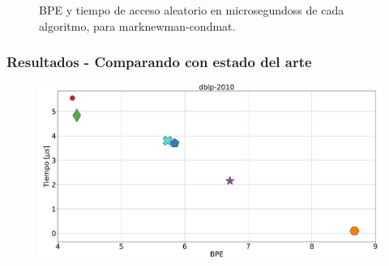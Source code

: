 \begin{frame}
\begin{figure}
\begin{minipage}{1\textwidth}
\begin{minipage}{0.15\textwidth}
    		\end{minipage}	
    	\end{minipage}

	\caption{BPE y tiempo de acceso aleatorio en microsegundoss de cada algoritmo, para marknewman-condmat.}
\end{figure}

\end{frame}

\begin{frame}
\frametitle{Resultados - Comparando con estado del arte}

\begin{figure}
	\centering
	
    	\begin{minipage}{1\textwidth}
    		\centering
    		\begin{minipage}{0.8\textwidth}
    			\centering
    			\includegraphics[width=1\linewidth]{../img/bpeTimes/aleatorio/dblp-2010.pdf}
    		\end{minipage}
    		\begin{minipage}{0.15\textwidth}
    			\centering

\end{minipage}
\end{minipage}
\end{figure}
\end{frame}
